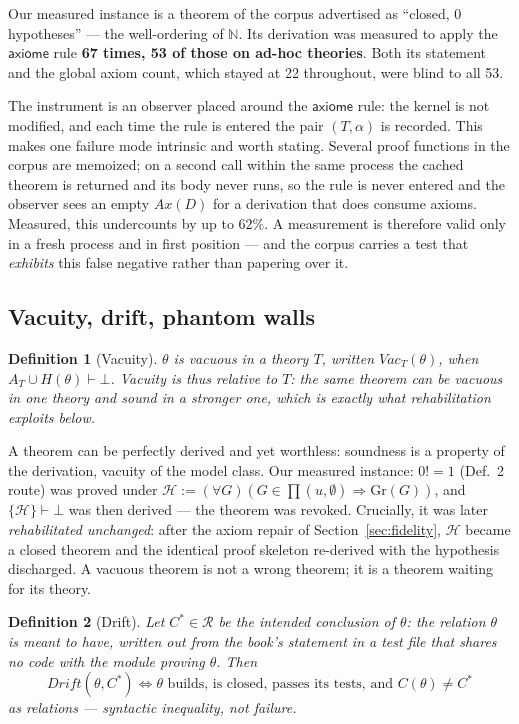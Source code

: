 \documentclass[11pt]{article}
\newtheorem{definition}{Definition}
\theoremstyle{remark}\newtheorem{example}{Example}
\begin{document}
Our measured instance is a theorem of the corpus advertised as ``closed, 0
hypotheses'' --- the well-ordering of $\mathbb{N}$. Its derivation was measured to
apply the $\mathsf{axiome}$ rule \textbf{67 times, 53 of those on ad-hoc theories}.
Both its statement and the global axiom count, which stayed at 22 throughout, were
blind to all 53.

The instrument is an observer placed around the $\mathsf{axiome}$ rule: the kernel is
not modified, and each time the rule is entered the pair $(T, \alpha)$ is recorded.
This makes one failure mode intrinsic and worth stating. Several proof functions in the
corpus are memoized; on a second call within the same process the cached theorem is
returned and its body never runs, so the rule is never entered and the observer sees
an empty $Ax(D)$ for a derivation that does consume axioms. Measured, this undercounts
by up to $62\%$. A measurement is therefore valid only in a fresh process and in first
position --- and the corpus carries a test that \emph{exhibits} this false negative
rather than papering over it.

\subsection{Vacuity, drift, phantom walls}
\begin{definition}[Vacuity] $\theta$ is \emph{vacuous in} a theory $T$, written
$\mathit{Vac}_T(\theta)$, when $A_T \cup H(\theta) \vdash \bot$. Vacuity is thus
relative to $T$: the same theorem can be vacuous in one theory and sound in a
stronger one, which is exactly what rehabilitation exploits below.
\end{definition}
A theorem can be perfectly derived and yet worthless: soundness is a property of the
derivation, vacuity of the model class. Our measured instance: $0! = 1$ (Def.~2 route)
was proved under $\mathcal{H} := (\forall G)(G \in \prod(u,\emptyset) \Rightarrow
\mathrm{Gr}(G))$, and $\{\mathcal{H}\} \vdash \bot$ was then derived --- the theorem was
revoked. Crucially, it was later \emph{rehabilitated unchanged}: after the axiom repair
of Section~\ref{sec:fidelity}, $\mathcal{H}$ became a closed theorem and the identical
proof skeleton re-derived with the hypothesis discharged. A vacuous theorem is not a
wrong theorem; it is a theorem waiting for its theory.

\begin{definition}[Drift]
Let $C^\ast \in \mathcal{R}$ be the \emph{intended conclusion} of $\theta$: the
relation $\theta$ is meant to have, written out from the book's statement in a test
file that shares no code with the module proving $\theta$. Then
\[ \mathit{Drift}(\theta, C^\ast) \iff \theta \text{ builds, is closed, passes its
   tests, and } C(\theta) \neq C^\ast \]
as relations --- syntactic inequality, not failure.
\end{definition}
\end{document}
